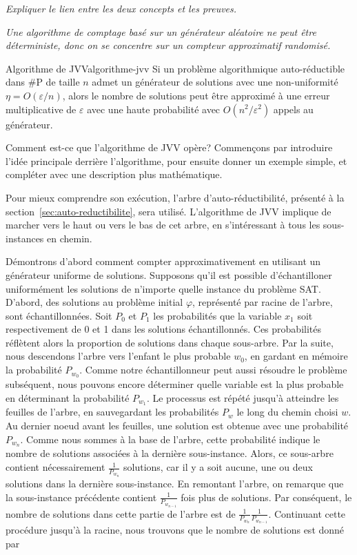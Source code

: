 \textcolor{mydarkred}{\textit{Expliquer le lien entre les deux concepts et les preuves.}}

\textcolor{mydarkred}{\textit{Une algorithme de comptage basé sur un générateur aléatoire ne peut être déterministe, donc on se concentre sur un compteur approximatif randomisé.}}

\begin{maintheorem}{Algorithme de JVV}{algorithme-jvv}
    Si un problème algorithmique auto-réductible dans \textsf{\#P} de taille $n$ admet un générateur de solutions avec une non-uniformité $\eta = O(\varepsilon / n)$, alors le nombre de solutions peut être approximé à une erreur multiplicative de $\varepsilon$ avec une haute probabilité avec $O(n^{2}/\varepsilon^{2})$ appels au générateur.
\end{maintheorem}

Comment est-ce que l'algorithme de JVV opère? Commençons par introduire l'idée principale derrière l'algorithme, pour ensuite donner un exemple simple, et compléter avec une description plus mathématique. 

Pour mieux comprendre son exécution, l'arbre d'auto-réductibilité, présenté à la section~\ref{sec:auto-reductibilite}, sera utilisé. L'algorithme de JVV implique de marcher vers le haut ou vers le bas de cet arbre, en s'intéressant à tous les sous-instances en chemin.

Démontrons d'abord comment compter approximativement en utilisant un générateur uniforme de solutions. Supposons qu'il est possible d'échantilloner uniformément les solutions de n'importe quelle instance du problème SAT. D'abord, des solutions au problème initial $\varphi$, représenté par racine de l'arbre, sont échantillonnées. Soit $P_{0}$ et $P_{1}$ les probabilités que la variable $x_{1}$ soit respectivement de 0 et 1 dans les solutions échantillonnés. Ces probabilités réflètent alors la proportion de solutions dans chaque sous-arbre. Par la suite, nous descendons l'arbre vers l'enfant le plus probable $w_{0}$, en gardant en mémoire la probabilité $P_{w_{0}}$. Comme notre échantillonneur peut aussi résoudre le problème subséquent, nous pouvons encore déterminer quelle variable est la plus probable en déterminant la probabilité $P_{w_{1}}$. Le processus est répété jusqu'à atteindre les feuilles de l'arbre, en sauvegardant les probabilités $P_{w}$ le long du chemin choisi $w$. Au dernier noeud avant les feuilles, une solution est obtenue avec une probabilité $P_{w_{n}}$. Comme nous sommes à la base de l'arbre, cette probabilité indique le nombre de solutions associées à la dernière sous-instance. Alors, ce sous-arbre contient nécessairement $\frac{1}{P_{w_{n}}}$ solutions, car il y a soit aucune, une ou deux solutions dans la dernière sous-instance. En remontant l'arbre, on remarque que la sous-instance précédente contient $\frac{1}{P_{w_{n-1}}}$ fois plus de solutions. Par conséquent, le nombre de solutions dans cette partie de l'arbre est de $\frac{1}{P_{w_{n}}} \frac{1}{P_{w_{n-1}}}$. Continuant cette procédure jusqu'à la racine, nous trouvons que le nombre de solutions est donné par 


